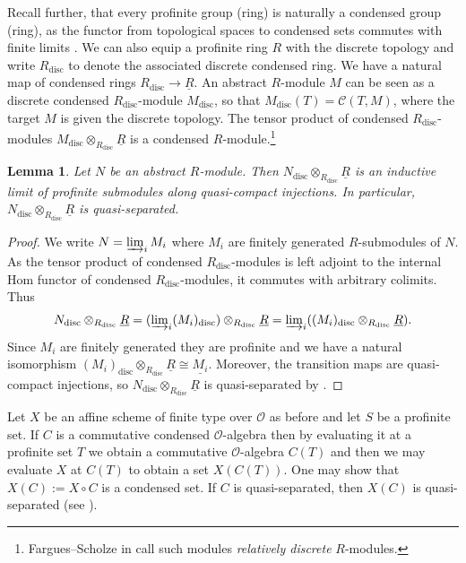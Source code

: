 \documentclass{amsart}
\newtheorem{lem}[prop]{Lemma}
\theoremstyle{definition}
\theoremstyle{remark}
\newcommand{\OO}{\mathcal O}
\newcommand{\disc}{\operatorname{disc}} %
\newcommand{\Cont}{\mathcal{C}}
\begin{document}
Recall further, that every profinite group (ring) is naturally a condensed group (ring), as the functor from topological spaces to condensed sets commutes with finite limits \cite[Proposition 1.7]{ScholzeCond}. We can also equip a profinite ring $R$ with the discrete topology and write $R_{\disc}$ to denote the associated discrete condensed ring.  We have a natural map of condensed rings $R_{\disc} \to \underline{R}$. An abstract $R$-module $M$ can be seen as a discrete condensed $R_{\disc}$-module $M_{\disc}$, so that 
$M_{\disc}(T)=\Cont(T, M)$, where the target $M$ is given the discrete topology.
The tensor product of condensed $R_{\disc}$-modules $M_{\disc} \otimes_{R_{\disc}} \underline{R}$ is a condensed $R$-module.\footnote{Fargues--Scholze in \cite[Section VIII]{fargues2021geometrization}
call such modules \emph{relatively discrete} $R$-modules.}


\begin{lem}\label{rel_disc_is_qs} Let $N$ be an abstract $R$-module. Then $N_{\disc} \otimes_{R_{\disc}} \underline{R}$ 
is an inductive limit of profinite submodules along quasi-compact injections. In particular, 
$N_{\disc} \otimes_{R_{\disc}} \underline{R}$ is quasi-separated.
\end{lem}
\begin{proof} We write $N=\varinjlim_i M_i$ where $M_i$ are finitely generated $R$-submodules 
of $N$. As the tensor product of condensed $R_{\disc}$-modules is left adjoint to the internal Hom functor of condensed $R_{\disc}$-modules, it commutes with arbitrary colimits. Thus
    \begin{align*}
        N_{\disc} \otimes_{R_{\disc}} \underline{R} = (\varinjlim\nolimits_i (M_{i})_{\disc}) \otimes_{R_{\disc}} \underline{R} = \varinjlim\nolimits_i ((M_i)_{\disc} \otimes_{R_{\disc}} \underline{R}).
    \end{align*}
    Since $M_i$ are finitely generated they are profinite and we have a natural isomorphism 
    $(M_i)_{\disc}\otimes_{R_{\disc}} \underline{R} \cong \underline{M_i}$. 
    Moreover, the transition maps are quasi-compact injections, so $N_{\disc} \otimes_{R_{\disc}} \underline{R}$ is quasi-separated by .
\end{proof}



Let $X$ be an affine scheme of finite type over $\OO$ as before and let $S$ be a profinite set. 
If $C$ is a commutative condensed $\OO$-algebra then by evaluating it at a profinite set $T$ 
we obtain a commutative $\OO$-algebra $C(T)$ and then we may evaluate $X$ at $C(T)$ to obtain a set $X(C(T))$. One may show that $X(C):= X \circ C$ is a
condensed set. If $C$ is quasi-separated, then $X(C)$ is quasi-separated (see ).
\end{document}
